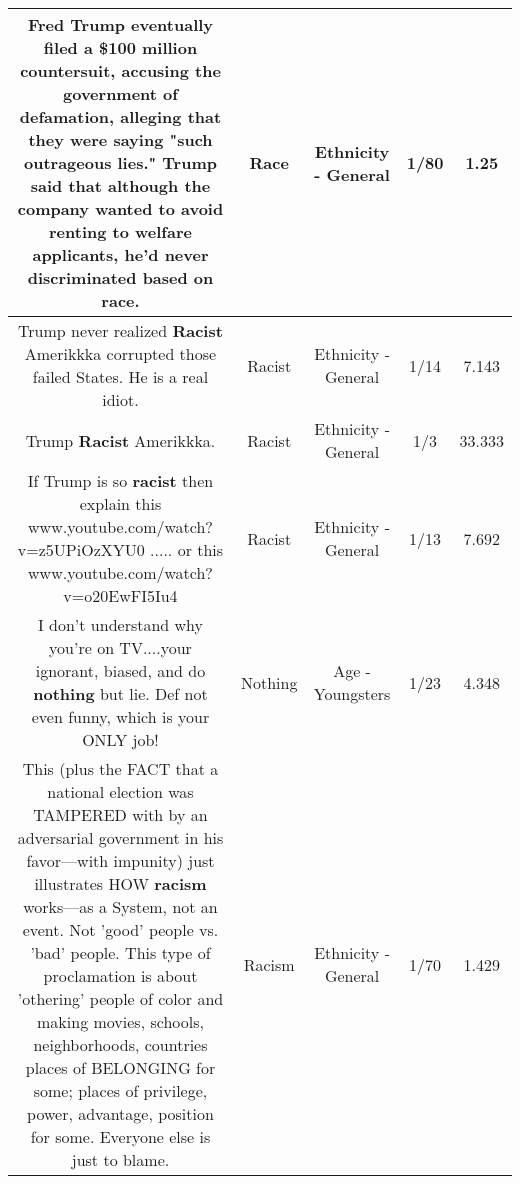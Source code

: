 \documentclass[11pt]{article}
\newlength\mylength
\begin{document}
\begin{center}
\begin{longtable}{|C{.65\mylength}|C{.30\mylength}|C{.12\mylength}|C{.12\mylength}|C{.12\mylength}|}
Fred Trump eventually filed a \$100 million countersuit, accusing the government of defamation, alleging that they were saying "such outrageous lies." Trump said that although the company wanted to avoid renting to welfare applicants, he'd never discriminated based on \textbf{race}.\normalsize   & Race & Ethnicity - General & 1/80 & 1.25 \\  \hline
  \small Trump never realized \textbf{Racist} Amerikkka corrupted those failed States. He is a real idiot.\normalsize   & Racist & Ethnicity - General & 1/14 & 7.143 \\  \hline
  \small Trump \textbf{Racist} Amerikkka.\normalsize   & Racist & Ethnicity - General & 1/3 & 33.333 \\  \hline
  \small If Trump is so \textbf{racist} then explain this www.youtube.com/watch?v=z5UPiOzXYU0 ..... or this www.youtube.com/watch?v=o20EwFI5Iu4\normalsize   & Racist & Ethnicity - General & 1/13 & 7.692 \\  \hline
  \small I don't understand why you're on TV....your ignorant, biased, and do \textbf{nothing} but lie.  Def not even funny, which is your ONLY job!\normalsize   & Nothing & Age - Youngsters & 1/23 & 4.348 \\  \hline
  \small This (plus the FACT that a national election was TAMPERED with by an adversarial government in his favor—with impunity) just illustrates HOW \textbf{racism} works—as a System, not an event. Not 'good' people vs. 'bad' people. This type of proclamation is about 'othering' people of color and making movies, schools, neighborhoods, countries places of BELONGING for some; places of privilege, power, advantage, position for some. Everyone else is just to blame.\normalsize   & Racism & Ethnicity - General & 1/70 & 1.429 \\  \hline

\end{longtable}
\end{center}
\end{document}
